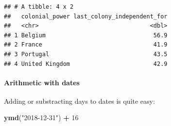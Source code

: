 \documentclass[]{gitbook}
\newenvironment{Shaded}{\begin{snugshade}}{\end{snugshade}}
\newcommand{\DataTypeTok}[1]{\textcolor[rgb]{0.13,0.29,0.53}{#1}}
\newcommand{\DecValTok}[1]{\textcolor[rgb]{0.00,0.00,0.81}{#1}}
\newcommand{\KeywordTok}[1]{\textcolor[rgb]{0.13,0.29,0.53}{\textbf{#1}}}
\newcommand{\NormalTok}[1]{#1}
\newcommand{\OperatorTok}[1]{\textcolor[rgb]{0.81,0.36,0.00}{\textbf{#1}}}
\newcommand{\OtherTok}[1]{\textcolor[rgb]{0.56,0.35,0.01}{#1}}
\newcommand{\StringTok}[1]{\textcolor[rgb]{0.31,0.60,0.02}{#1}}
\let\oldparagraph\paragraph
\renewcommand{\paragraph}[1]{\oldparagraph{#1}\mbox{}}
\begin{document}
\begin{Shaded}
\end{Shaded}

\begin{verbatim}
## # A tibble: 4 x 2
##   colonial_power last_colony_independent_for
##   <chr>                                <dbl>
## 1 Belgium                               56.9
## 2 France                                41.9
## 3 Portugal                              43.5
## 4 United Kingdom                        42.9
\end{verbatim}

\hypertarget{arithmetic-with-dates}{%
\paragraph{Arithmetic with dates}\label{arithmetic-with-dates}}

Adding or substracting days to dates is quite easy:

\begin{Shaded}
\begin{Highlighting}[]
\KeywordTok{ymd}\NormalTok{(}\StringTok{"2018-12-31"}\NormalTok{) }\OperatorTok{+}\StringTok{ }\DecValTok{16}
\end{Highlighting}
\end{Shaded}
\end{document}
